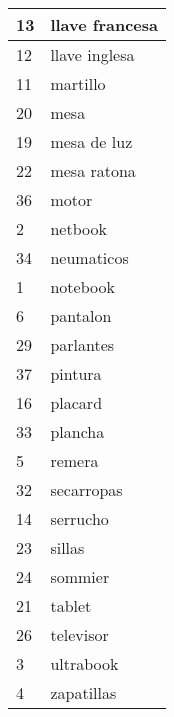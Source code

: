\begin{longtable}{|l|l|}
13 & llave francesa \\ \hline 
12 & llave inglesa \\ \hline 
11 & martillo \\ \hline 
20 & mesa \\ \hline 
19 & mesa de luz \\ \hline 
22 & mesa ratona \\ \hline 
36 & motor \\ \hline 
2 & netbook \\ \hline 
34 & neumaticos \\ \hline 
1 & notebook \\ \hline 
6 & pantalon \\ \hline 
29 & parlantes \\ \hline 
37 & pintura \\ \hline 
16 & placard \\ \hline 
33 & plancha \\ \hline 
5 & remera \\ \hline 
32 & secarropas \\ \hline 
14 & serrucho \\ \hline 
23 & sillas \\ \hline 
24 & sommier \\ \hline 
21 & tablet \\ \hline 
26 & televisor \\ \hline 
3 & ultrabook \\ \hline 
4 & zapatillas \\ \hline 
 \end{longtable}

